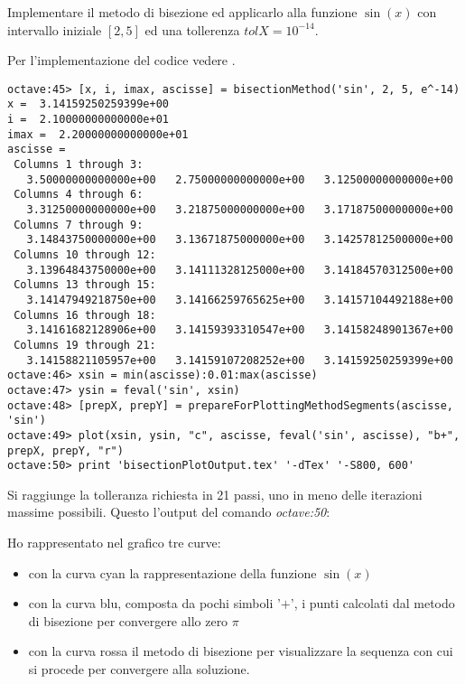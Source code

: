 \begin{exercise}
Implementare il metodo di bisezione ed applicarlo alla funzione $\sin(x)$ 
con intervallo iniziale $[2, 5]$ ed una tollerenza $tolX = 10^{-14}$.
\end{exercise}
Per l'implementazione del codice vedere .
\begin{lstlisting}
octave:45> [x, i, imax, ascisse] = bisectionMethod('sin', 2, 5, e^-14)
x =  3.14159250259399e+00
i =  2.10000000000000e+01
imax =  2.20000000000000e+01
ascisse =
 Columns 1 through 3:
   3.50000000000000e+00   2.75000000000000e+00   3.12500000000000e+00
 Columns 4 through 6:
   3.31250000000000e+00   3.21875000000000e+00   3.17187500000000e+00
 Columns 7 through 9:
   3.14843750000000e+00   3.13671875000000e+00   3.14257812500000e+00
 Columns 10 through 12:
   3.13964843750000e+00   3.14111328125000e+00   3.14184570312500e+00
 Columns 13 through 15:
   3.14147949218750e+00   3.14166259765625e+00   3.14157104492188e+00
 Columns 16 through 18:
   3.14161682128906e+00   3.14159393310547e+00   3.14158248901367e+00
 Columns 19 through 21:
   3.14158821105957e+00   3.14159107208252e+00   3.14159250259399e+00
octave:46> xsin = min(ascisse):0.01:max(ascisse)
octave:47> ysin = feval('sin', xsin)
octave:48> [prepX, prepY] = prepareForPlottingMethodSegments(ascisse, 'sin')
octave:49> plot(xsin, ysin, "c", ascisse, feval('sin', ascisse), "b+", prepX, prepY, "r")
octave:50> print 'bisectionPlotOutput.tex' '-dTex' '-S800, 600'
\end{lstlisting}
Si raggiunge la tolleranza richiesta in 21 passi, uno in meno delle iterazioni
massime possibili. Questo l'output del comando \emph{octave:50}:
\begin{center}

\end{center}
Ho rappresentato nel grafico tre curve: 
\begin{itemize}
  \item con la curva cyan la rappresentazione della funzione $\sin(x)$
  \item con la curva blu, composta da pochi simboli '$+$', i punti
  calcolati dal metodo di bisezione per convergere allo zero $\pi$
  \item con la curva rossa il metodo di bisezione per visualizzare
  la sequenza con cui si procede per convergere alla soluzione.
\end{itemize}

